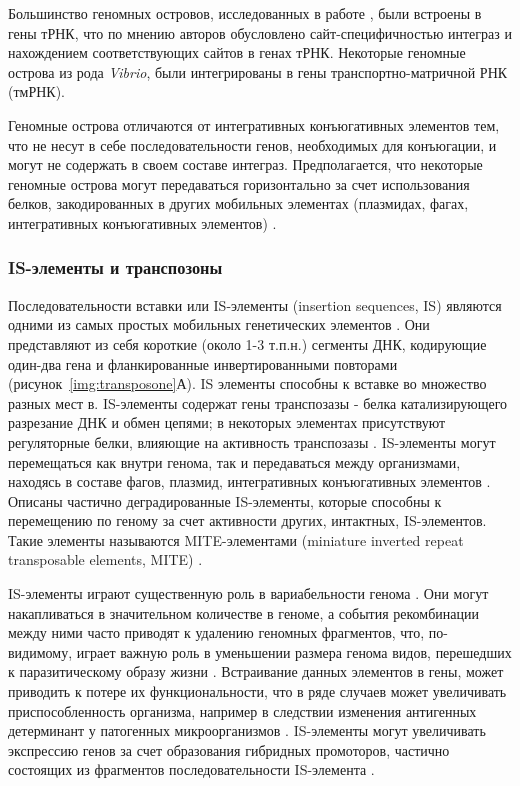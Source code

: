 Большинство геномных островов, исследованных в работе \cite{boyd2009genomic}, были встроены в гены тРНК, что по мнению авторов обусловлено сайт-специфичностью интеграз и нахождением соответствующих сайтов в генах тРНК. Некоторые геномные острова из рода \textit{Vibrio}, были интегрированы в гены транспортно-матричной РНК (тмРНК). 

Геномные острова отличаются от интегративных конъюгативных элементов тем, что не несут в себе последовательности генов, необходимых для конъюгации, и могут не содержать в своем составе интеграз. Предполагается, что некоторые геномные острова могут передаваться горизонтально за счет использования белков, закодированных в других мобильных элементах (плазмидах, фагах, интегративных конъюгативных элементов) \cite{boyd2009genomic}.

\subsubsection{IS-элементы и транспозоны}
Последовательности вставки или IS-элементы (insertion sequences, IS) являются одними из самых простых мобильных генетических элементов \cite{vandecraen2017impact}. Они представляют из себя короткие (около 1-3 т.п.н.) сегменты ДНК, кодирующие один-два гена и фланкированные инвертированными повторами (рисунок~\ref{img:transposone}А). IS элементы способны к вставке во множество разных мест в. IS-элементы содержат гены транспозазы - белка катализирующего разрезание ДНК и обмен цепями; в некоторых элементах присутствуют регуляторные белки, влияющие на активность транспозазы \cite{siguier2015everyman}. IS-элементы могут перемещаться как внутри генома, так и передаваться между организмами, находясь в составе фагов, плазмид, интегративных конъюгативных элементов \cite{vandecraen2017impact}. Описаны частично деградированные IS-элементы, которые способны к перемещению по геному за счет активности других, интактных, IS-элементов. Такие элементы называются MITE-элементами (miniature inverted repeat transposable elements, MITE) \cite{oggioni1999repeated, siguier2015everyman}. 

IS-элементы играют существенную роль в вариабельности генома \cite{siguier2014bacterial}. Они могут накапливаться в значительном количестве в геноме, а события рекомбинации  между ними часто приводят к удалению геномных фрагментов, что, по-видимому, играет важную роль в уменьшении размера генома видов, перешедших к паразитическому образу жизни \cite{siguier2015everyman}. Встраивание данных элементов в гены, может приводить к потере их функциональности, что в ряде случаев может увеличивать приспособленность организма, например в следствии изменения антигенных детерминант у патогенных микроорганизмов \cite{parkhill2003comparative}. IS-элементы могут увеличивать экспрессию генов за счет образования гибридных промоторов, частично состоящих из фрагментов последовательности IS-элемента \cite{glansdorff1981activation}.

